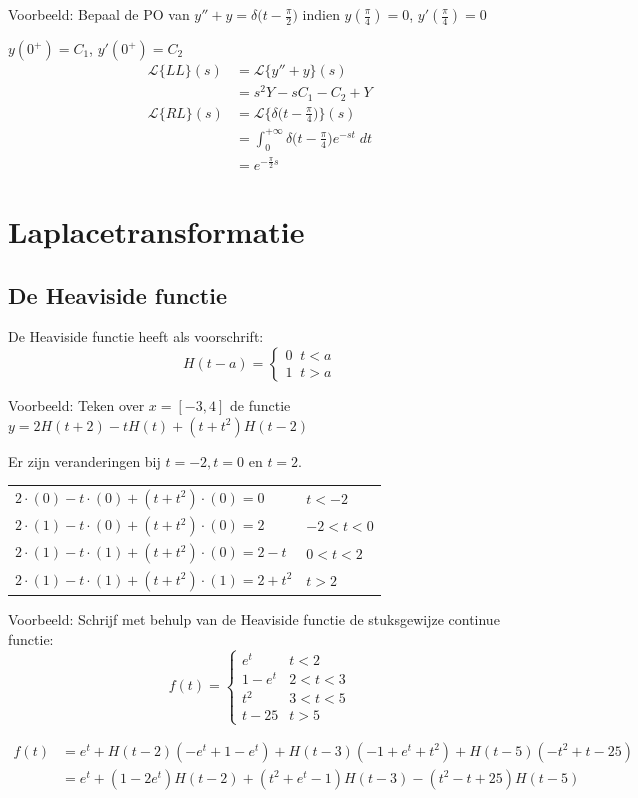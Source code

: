 \documentclass[12pt]{report}
\newcommand{\todo}[1]{
{\color{red}\textunderscore{\textit{TODO: #1}}}
}
\newcommand{\example}[2]{
    \hrulefill
    
    Voorbeeld: #1
    
    #2
    
    \hrulefill
}
\begin{document}
\example{
  Bepaal de PO van $y'' + y = \delta\big(t - \frac{\pi}{2}\big)$ indien $y(\frac{\pi}{4}) = 0$, $y'(\frac{\pi}{4}) = 0$
}{
  $y(0^+) = C_1$, $y'(0^+) = C_2$
  \begin{equation*}
   \begin{split}
    \mathcal{L}\{LL\}(s) & = \mathcal{L}\{y'' + y\}(s) \\
			 & = s^2Y - sC_1 - C_2 + Y \\
    \mathcal{L}\{RL\}(s) & = \mathcal{L}\bigg\{\delta\big(t - \frac{\pi}{4}\bigg)\bigg\}(s) \\
                         & = \int_0^{+\infty}\delta\big(t - \frac{\pi}{4}\big)e^{-st} \; dt \\
                         & = e^{-\frac{\pi}{2}s}
   \end{split}
  \end{equation*}

}


\chapter{Laplacetransformatie}
\section{De Heaviside functie}
De Heaviside functie heeft als voorschrift:
$$H(t - a) = 
\begin{cases}
0 \;\; t < a \\
1 \;\; t > a
\end{cases}$$

\example{Teken over $x=[-3,4]$ de functie $y = 2H(t + 2) - tH(t) + (t+t^2)H(t-2)$}
{
Er zijn veranderingen bij $t = -2, t = 0$ en $t = 2$.

    \begin{tabular}{l | l}
    $2\cdot(0) - t\cdot(0) + (t+t^2)\cdot(0) = 0$ & $t < -2$\\
    $2\cdot(1) - t\cdot(0) + (t+t^2)\cdot(0) = 2$ & $-2 < t < 0$  \\
    $2\cdot(1) - t\cdot(1) + (t+t^2)\cdot(0) = 2 - t$ & $0 < t < 2$\\
    $2\cdot(1) - t\cdot(1) + (t+t^2)\cdot(1) = 2 + t^2$ & $t > 2$\\
    \end{tabular}
\todo{graph}
}
\example{Schrijf met behulp van de Heaviside functie de stuksgewijze continue functie:
$$f(t) = \begin{cases}
        e^t & t < 2 \\
        1 - e^t & 2 < t < 3 \\
        t^2 & 3 < t < 5 \\
        t - 25 & t > 5
        \end{cases}
$$}{
\begin{equation*}
\begin{split}
    f(t) & = e^t + H(t-2)(-e^t + 1 - e^t) + H(t-3)(-1 + e^t + t^2) + H(t - 5)(-t^2 + t - 25) \\
    & = e^t + (1-2e^t)H(t-2) + (t^2+e^t-1)H(t-3) - (t^2-t+25)H(t-5)
\end{split}
\end{equation*}
}
\end{document}
